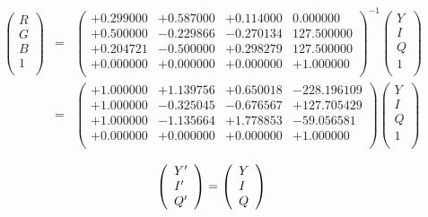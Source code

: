 \documentclass{article}
\begin{document}
\begin{eqnarray*} \left( \begin{array}{l} R \\ G \\ B \\ 1 \\ \end{array} \right) &=& \left( \begin{array}{llll} +0.299000 & +0.587000 & +0.114000 & 0.000000 \\ +0.500000 & -0.229866 & -0.270134 & 127.500000 \\ +0.204721 & -0.500000 & +0.298279 & 127.500000 \\ +0.000000 & +0.000000 & +0.000000 & +1.000000 \\ \end{array} \right)^{-1} \left( \begin{array}{l} Y \\ I \\ Q \\ 1 \\ \end{array} \right) \\ &=& \left( \begin{array}{llll} +1.000000 & +1.139756 & +0.650018 & -228.196109 \\ +1.000000 & -0.325045 & -0.676567 & +127.705429 \\ +1.000000 & -1.135664 & +1.778853 & -59.056581 \\ +0.000000 & +0.000000 & +0.000000 & +1.000000 \\ \end{array} \right) \left( \begin{array}{l} Y \\ I \\ Q \\ 1 \\ \end{array} \right) \end{eqnarray*}
\pagebreak

\[ \left( \begin{array}{l} Y' \\ I' \\ Q' \\ \end{array} \right) = \left( \begin{array}{l} Y \\ I \\ Q \\ \end{array} \right) \\ \]
\pagebreak
\end{document}
